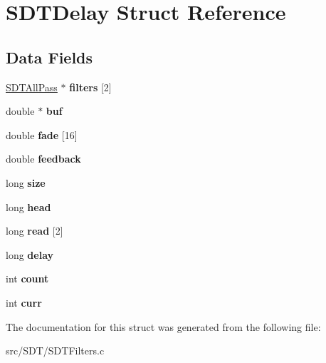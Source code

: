 \hypertarget{struct_s_d_t_delay}{}\section{S\+D\+T\+Delay Struct Reference}
\label{struct_s_d_t_delay}
\subsection*{Data Fields}
\begin{DoxyCompactItemize}
\item 
\hypertarget{struct_s_d_t_delay_ae273117a37d6664e541a6d89550d3587}{}\hyperlink{struct_s_d_t_all_pass}{S\+D\+T\+All\+Pass} $\ast$ {\bfseries filters} \mbox{[}2\mbox{]}\label{struct_s_d_t_delay_ae273117a37d6664e541a6d89550d3587}

\item 
\hypertarget{struct_s_d_t_delay_a33295bb8f8885c76a0d2a44eb3d742f3}{}double $\ast$ {\bfseries buf}\label{struct_s_d_t_delay_a33295bb8f8885c76a0d2a44eb3d742f3}

\item 
\hypertarget{struct_s_d_t_delay_a5726df167bff9a45698c5b7a9faf57f3}{}double {\bfseries fade} \mbox{[}16\mbox{]}\label{struct_s_d_t_delay_a5726df167bff9a45698c5b7a9faf57f3}

\item 
\hypertarget{struct_s_d_t_delay_ad2d858cbb2e088d67a4ddea619ad2c3a}{}double {\bfseries feedback}\label{struct_s_d_t_delay_ad2d858cbb2e088d67a4ddea619ad2c3a}

\item 
\hypertarget{struct_s_d_t_delay_a37363161b41c4165b98cba7abc7a9d95}{}long {\bfseries size}\label{struct_s_d_t_delay_a37363161b41c4165b98cba7abc7a9d95}

\item 
\hypertarget{struct_s_d_t_delay_afbe8d22b3651e74c9c1035b1557ae5b1}{}long {\bfseries head}\label{struct_s_d_t_delay_afbe8d22b3651e74c9c1035b1557ae5b1}

\item 
\hypertarget{struct_s_d_t_delay_ac8119e6cba7ee2a8377ea00d51c94fc9}{}long {\bfseries read} \mbox{[}2\mbox{]}\label{struct_s_d_t_delay_ac8119e6cba7ee2a8377ea00d51c94fc9}

\item 
\hypertarget{struct_s_d_t_delay_a3465e71050ee8220d3f57ba66c03e435}{}long {\bfseries delay}\label{struct_s_d_t_delay_a3465e71050ee8220d3f57ba66c03e435}

\item 
\hypertarget{struct_s_d_t_delay_ad43c3812e6d13e0518d9f8b8f463ffcf}{}int {\bfseries count}\label{struct_s_d_t_delay_ad43c3812e6d13e0518d9f8b8f463ffcf}

\item 
\hypertarget{struct_s_d_t_delay_a96010e8f175b18e5988b95a0cf09faa1}{}int {\bfseries curr}\label{struct_s_d_t_delay_a96010e8f175b18e5988b95a0cf09faa1}

\end{DoxyCompactItemize}


The documentation for this struct was generated from the following file\+:\begin{DoxyCompactItemize}
\item 
src/\+S\+D\+T/S\+D\+T\+Filters.\+c\end{DoxyCompactItemize}
